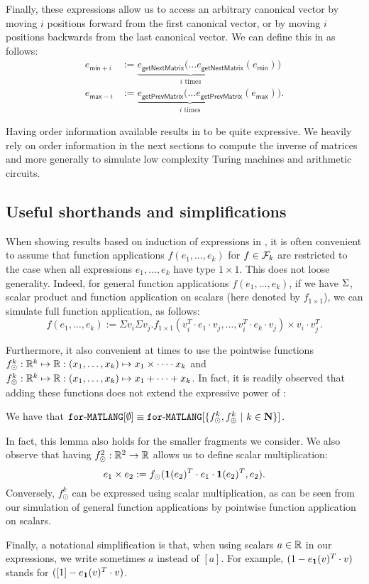 Finally, these expressions allow us to access an arbitrary canonical vector by moving $i$ positions forward from the first canonical vector, or by moving $i$ positions backwards from the last canonical vector. We can define this in \langfor as follows:  
\begin{align*}
e_{\mathsf{min}+i} &:= \underbrace{e_{\mathsf{getNextMatrix}}(\ldots e_{\mathsf{getNextMatrix}}}_{i \text{ times}}(e_{\mathsf{min}}))\\
e_{\mathsf{max}-i} &:= \underbrace{e_{\mathsf{getPrevMatrix}}(\ldots e_{\mathsf{getPrevMatrix}}}_{i \text{ times}}(e_{\mathsf{max}})).
\end{align*}

Having order information available results in \langfor to be quite expressive.
We heavily rely on order information in the next sections to compute the inverse of matrices and more generally to simulate low complexity Turing machines and arithmetic circuits.


\subsection{Useful shorthands and simplifications}\label{sec:queries:simp}


When showing results based on induction of expressions in \langfor, it is often convenient to assume that function applications $f(e_1,\ldots,e_k)$ for $f\in\mathcal{F}_k$ are restricted to
the case when all expressions $e_1,\ldots,e_k$ have type $1\times 1$. This does not loose generality. Indeed,
for general function applications $f(e_1,\ldots,e_k)$, if we have $\Sigma$, scalar product and function application on scalars (here denoted by $f_{1\times 1}$), we can simulate full function application, as follows:
 $$
f(e_1,\ldots, e_k) :=\Sigma v_i \Sigma v_j. f_{1\times 1}(v_i^T\cdot e_1\cdot v_j, \ldots ,v_i^T\cdot e_k\cdot v_j) \times v_i\cdot v_j^T.
$$

Furthermore, it also convenient at times to use the pointwise functions
$f_\odot^k:\mathbb{R}^k\mapsto \mathbb{R}:(x_1,\ldots,x_k)\mapsto x_1\times\cdots \cdot x_k$ and 
$f_\oplus^k:\mathbb{R}^k\mapsto \mathbb{R}:(x_1,\ldots,x_k)\mapsto x_1+\cdots + x_k$. In fact, it is readily observed that adding these functions does not extend the expressive power of \langfor:
\begin{lemma}
\label{lm-prod-sum}
We have that $\texttt{for}\text{-}\texttt{MATLANG}[\emptyset] \equiv \texttt{for}\text{-}\texttt{MATLANG}[\{f_\odot^k,f_\oplus^k \ | \ k\in \mathbf{N}\}]$.
\end{lemma}
In fact, this lemma also holds for the smaller fragments we consider.
%
We also observe that having $f_\odot^2:\mathbb{R}^2\to\mathbb{R}$ allows us to define scalar multiplication:
$$
e_1\times e_2 :=f_{\odot}(\mathbf{1}(e_2)^T\cdot e_1 \cdot \mathbf{1}(e_2)^T, e_2).
$$
Conversely, $f_\odot^k$ can be expressed using scalar multiplication, as can be seen from our simulation of general function applications by pointwise function application on scalars.

Finally, a notational simplification is that, when using scalars $a\in\mathbb{R}$ in our expressions, we write sometimes
$a$ instead of $[a]$. For example,  $(1-e_{\mathbf{1}}(v)^T\cdot v)$ stands for  $([1]-e_{\mathbf{1}}(v)^T\cdot v)$.